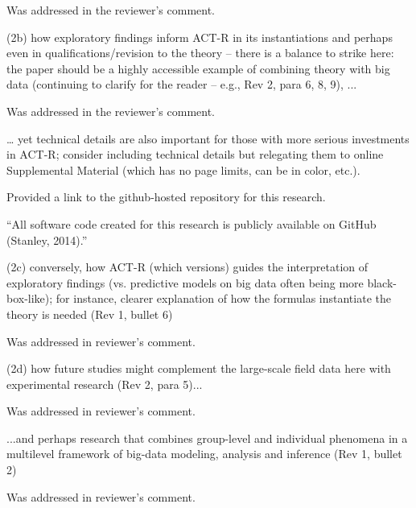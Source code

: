 \documentclass[answers,12pt]{exam}
\begin{document}
\begin{questions}
\begin{solution}
Was addressed in the reviewer's comment.
\end{solution}

\question (2b) how exploratory findings inform ACT-R in its instantiations and perhaps even in qualifications/revision to the theory -- there is a balance to strike here: the paper should be a highly accessible example of combining theory with big data (continuing to clarify for the reader -- e.g., Rev 2, para 6, 8, 9), ...

\begin{solution}
Was addressed in the reviewer's comment.
\end{solution}

\question … yet technical details are also important for those with more serious investments in ACT-R; consider including technical details but relegating them to online Supplemental Material (which has no page limits, can be in color, etc.).

\begin{solution}
Provided a link to the github-hosted repository for this research.

``All software code created for this research is publicly available on GitHub (Stanley, 2014).''

\end{solution}

\question (2c) conversely, how ACT-R (which versions) guides the interpretation of exploratory findings (vs. predictive models on big data often being more black-box-like); for instance, clearer explanation of how the formulas instantiate the theory is needed (Rev 1, bullet 6)

\begin{solution}
Was addressed in reviewer's comment.
\end{solution}

\question (2d) how future studies might complement the large-scale field data here with experimental research (Rev 2, para 5)...

\begin{solution}
Was addressed in reviewer's comment.
\end{solution}

\question ...and perhaps research that combines group-level and individual phenomena in a multilevel framework of big-data modeling, analysis and inference (Rev 1, bullet 2)

\begin{solution}
Was addressed in reviewer's comment.
\end{solution}


\end{questions}
\end{document}

